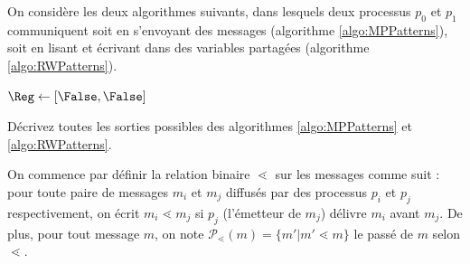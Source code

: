 
\begingroup


\begin{exercice}

  On considère les deux algorithmes suivants, dans lesquels deux processus $p_0$ et $p_1$
  communiquent soit en s'envoyant des messages (algorithme \ref{algo:MPPatterns}), soit en
  lisant et écrivant dans des variables partagées (algorithme \ref{algo:RWPatterns}). 
  
  \begin{minipage}{.5\textwidth}
    \begin{algorithm}[H]
      \caption{Motifs en passage de messages}
      \label{algo:MPPatterns}
    \end{algorithm}
  \end{minipage}
  \begin{minipage}{.5\textwidth}
    \begin{algorithm}[H]
      $\Reg \leftarrow [\False, \False]$\;
      \caption{Motifs en mémoire partagée}
      \label{algo:RWPatterns}
    \end{algorithm}
  \end{minipage}
  
  \begin{questions}
  \item Décrivez toutes les sorties possibles des algorithmes \ref{algo:MPPatterns} et \ref{algo:RWPatterns}. 
  \end{questions}

  On commence par définir la relation binaire $\lessdot$ sur les messages comme suit : pour toute paire de messages $m_i$ et $m_j$ diffusés
  par des processus $p_i$ et $p_j$ respectivement, on écrit $m_i \lessdot m_j$ si $p_j$ (l'émetteur de $m_j$) délivre $m_i$ avant $m_j$.
  De plus, pour tout message $m$, on note $\mathscr{P}_{\lessdot}(m) = \{m' | m' \lessdot m\}$ le passé de $m$ selon $\lessdot$. 


\end{exercice}
